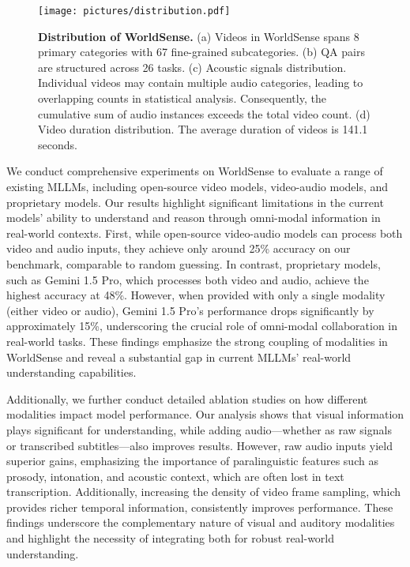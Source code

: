 \begin{figure*}[htp]
  \centering
  \texttt{[image: pictures/distribution.pdf]}
  \caption{\textbf{Distribution of WorldSense.} (a) Videos in WorldSense spans 8 primary categories with 67 fine-grained subcategories. (b) QA pairs are structured across 26 tasks. (c) Acoustic signals distribution. Individual videos may contain multiple audio categories, leading to overlapping counts in statistical analysis. Consequently, the cumulative sum of audio instances exceeds the total video count. (d) Video duration distribution. The average duration of videos is 141.1 seconds. }
  \vspace{-6mm}
  \label{fig:data_dist}
\end{figure*}

We conduct comprehensive experiments on WorldSense to evaluate a range of existing MLLMs, including open-source video models, video-audio models, and proprietary models. Our results highlight significant limitations in the current models’ ability to understand and reason through omni-modal information in real-world contexts. First, while open-source video-audio models can process both video and audio inputs, they achieve only around 25\% accuracy on our benchmark, comparable to random guessing. In contrast, proprietary models, such as Gemini 1.5 Pro, which processes both video and audio, achieve the highest accuracy at 48\%. However, when provided with only a single modality (either video or audio), Gemini 1.5 Pro’s performance drops significantly by approximately 15\%, underscoring the crucial role of omni-modal collaboration in real-world tasks. These findings emphasize the strong coupling of modalities in WorldSense and reveal a substantial gap in current MLLMs’ real-world understanding capabilities.

Additionally, we further conduct detailed ablation studies on how different modalities impact model performance. Our analysis shows that visual information plays significant for understanding, while adding audio—whether as raw signals or transcribed subtitles—also improves results. However, raw audio inputs yield superior gains, emphasizing the importance of paralinguistic features such as prosody, intonation, and acoustic context, which are often lost in text transcription. Additionally, increasing the density of video frame sampling, which provides richer temporal information, consistently improves performance. These findings underscore the complementary nature of visual and auditory modalities and highlight the necessity of integrating both for robust real-world understanding.



